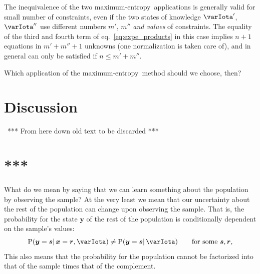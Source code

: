 \documentclass{article}
\makeatletter
\theoremstyle{remark}
\theoremstyle{innote}
\def\sum{\DOTSI\sumop\slimits@}
\renewcommand*{\|}{\mathpunct{|}}%
\renewcommand{\le}{\leqslant}%
\newcommand*{\p}{\mathrm{P}}%
\newcommand*{\eqn}{eq.}%
\newcommand*{\E}{\mathrm{E}}
\DeclarePairedDelimiter\expp{(}{)}
\newcommand*{\expe}{\E\expp}%
\theoremstyle{simple}
\newcommand*{\puzzle}{{\fontencoding{U}\fontfamily{fontawesometwo}\selectfont\symbol{225}}}
\newcommand*{\mynote}[1]{ {\color{notecolour}\puzzle\ #1}}
\newcommand*{\widebar}[1]{{\mkern1.5mu\skew{2}\overline{\mkern-1.5mu#1\mkern-1.5mu}\mkern 1.5mu}}
\newcommand*{\av}{\widebar} %
\newcommand*{\sav}{\widebar} %
\newcommand*{\yxx}{x}%
\newcommand*{\yx}{\bm{\yxx}}%
\newcommand*{\yX}{\bm{X}}%
\newcommand*{\yy}{\bm{y}}%
\newcommand*{\yr}{\bm{r}}%
\newcommand*{\ys}{\bm{s}}%
\newcommand*{\yH}{\varIota}
\newcommand*{\yHa}{\varIota'}
\newcommand*{\yHb}{\varIota''}
\newcommand*{\me}{maximum-entropy}
\makeatother
\begin{document}
The inequivalence of the two \me\ applications is generally valid for small
number of constraints, even if the two states of knowledge $\yHa$, $\yHb$
use different numbers $m'$, $m''$ \emph{and values} of constraints. The
equality of the third and fourth term of \eqn~\eqref{eq:expe_products} in
this case implies $n+1$ equations in $m'+m''+1$ unknowns (one normalization
is taken care of), and in general can only be satisfied if $n\le m'+m''$.

\medskip

Which application of the \me\ method should we choose, then?

\section{Discussion}
\label{sec:discussion}



{\centering\mynote{*** From here down old text to be discarded ***}\par}
\section{***}

What do we mean by saying that we can learn something about the population
by observing the sample? At the very least we mean that our uncertainty
about the rest of the population can change upon observing the sample. That
is, the probability for the state $\yy$ of the rest of the population is
conditionally dependent on the sample's values:
\begin{equation}
  \label{eq:conditionally_dependent_sample}
  \p(\yy =\ys \| \yx=\yr,\yH) \ne \p(\yy =\ys \|\yH)
  \qquad\text{for some $\ys,\yr$},
\end{equation}
This also means that the probability for the population cannot be
factorized into that of the sample times that of the complement.
\end{document}
